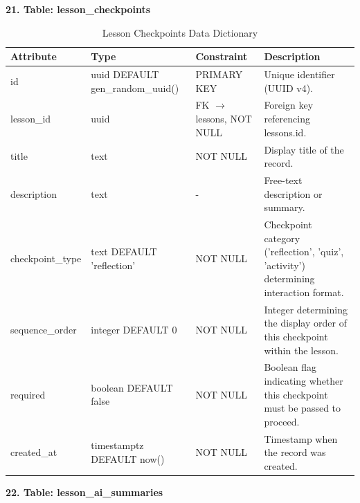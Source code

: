 \documentclass[12pt, oneside]{article} %
\newcommand{\tabbreak}{\hyphenpenalty=200\exhyphenpenalty=200\tolerance=4000\hbadness=10000\hspace{0pt}}
\begin{document}
\textbf{21. Table: lesson\_checkpoints}

\begin{table}[H]
\caption{Lesson Checkpoints Data Dictionary}
\label{tab:dd_lesson_checkpoints}
\vspace{-4mm}
\begin{center}
\renewcommand{\arraystretch}{1.15}
\scriptsize
\begin{tabular}{|>{\raggedright\arraybackslash\tabbreak}p{2.67cm}|>{\raggedright\arraybackslash\tabbreak}p{2.93cm}|>{\raggedright\arraybackslash\tabbreak}p{2.67cm}|>{\raggedright\arraybackslash\tabbreak}p{4.51cm}|}
\hline
\textbf{Attribute} & \textbf{Type} & \textbf{Constraint} & \textbf{Description} \\ \hline
id & uuid DEFAULT gen\_random\_uuid() & PRIMARY KEY & Unique identifier (UUID v4). \\ \hline
lesson\_id & uuid & FK $\rightarrow$ lessons, NOT NULL & Foreign key referencing lessons.id. \\ \hline
title & text & NOT NULL & Display title of the record. \\ \hline
description & text & - & Free-text description or summary. \\ \hline
checkpoint\_type & text DEFAULT 'reflection' & NOT NULL & Checkpoint category ('reflection', 'quiz', 'activity') determining interaction format. \\ \hline
sequence\_order & integer DEFAULT 0 & NOT NULL & Integer determining the display order of this checkpoint within the lesson. \\ \hline
required & boolean DEFAULT false & NOT NULL & Boolean flag indicating whether this checkpoint must be passed to proceed. \\ \hline
created\_at & timestamptz DEFAULT now() & NOT NULL & Timestamp when the record was created. \\ \hline
\end{tabular}
\end{center}
\end{table}

\textbf{22. Table: lesson\_ai\_summaries}
\end{document}
